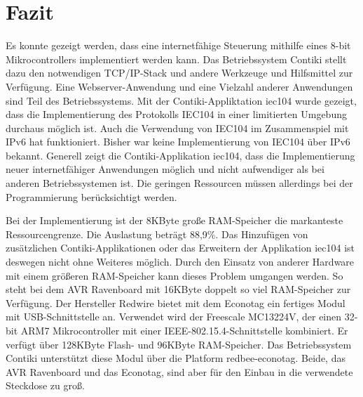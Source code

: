 \section{Fazit}

Es konnte gezeigt werden, dass eine internetfähige Steuerung mithilfe eines 8-bit Mikrocontrollers implementiert werden kann. Das Betriebssystem Contiki stellt dazu den notwendigen TCP/IP-Stack und andere Werkzeuge und Hilfsmittel zur Verfügung. Eine Webserver-Anwendung und eine Vielzahl anderer Anwendungen sind Teil des Betriebssystems. Mit der Contiki-Appliktation iec104 wurde gezeigt, dass die Implementierung des Protokolls IEC104 in einer limitierten Umgebung durchaus möglich ist. Auch die Verwendung von IEC104 im Zusammenspiel mit IPv6 hat funktioniert. Bisher war keine Implementierung von IEC104 über IPv6 bekannt. Generell zeigt die Contiki-Applikation iec104, dass die Implementierung neuer internetfähiger Anwendungen möglich und nicht aufwendiger als bei anderen Betriebssystemen ist. Die geringen Ressourcen müssen allerdings bei der Programmierung berücksichtigt werden.

Bei der Implementierung ist der 8KByte große RAM-Speicher die markanteste Ressourcengrenze. Die Auslastung beträgt 88,9\%. Das Hinzufügen von zusätzlichen Contiki-Applikationen oder das Erweitern der Applikation iec104 ist deswegen nicht ohne Weiteres möglich. Durch den Einsatz von anderer Hardware mit einem größeren RAM-Speicher kann dieses Problem umgangen werden. So steht bei dem AVR Ravenboard mit 16KByte doppelt so viel RAM-Speicher zur Verfügung. Der Hersteller Redwire bietet mit dem Econotag ein fertiges Modul mit USB-Schnittstelle an. Verwendet wird der Freescale MC13224V, der einen 32-bit ARM7 Mikrocontroller mit einer IEEE-802.15.4-Schnittstelle kombiniert. Er verfügt über 128KByte Flash- und 96KByte RAM-Speicher. Das Betriebssystem Contiki unterstützt diese Modul über die Platform redbee-econotag. Beide, das AVR Ravenboard und das Econotag, sind aber für den Einbau in die verwendete Steckdose zu groß.


